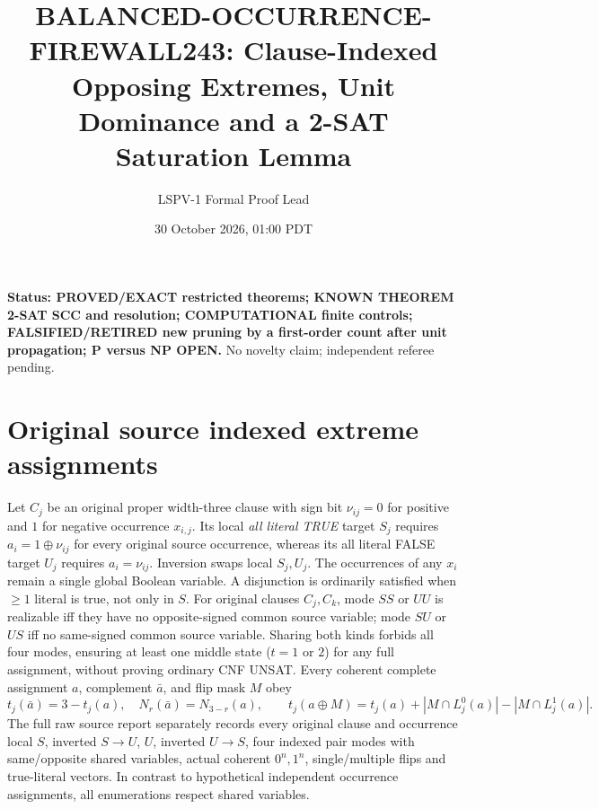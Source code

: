 \documentclass[10pt]{article}
\title{BALANCED-OCCURRENCE-FIREWALL243: Clause-Indexed Opposing Extremes, Unit Dominance and a 2-SAT Saturation Lemma}
\author{LSPV-1 Formal Proof Lead}
\date{30 October 2026, 01:00 PDT}
\begin{document}
\maketitle
\noindent\textbf{Status: PROVED/EXACT restricted theorems; KNOWN THEOREM 2-SAT SCC and resolution; COMPUTATIONAL finite controls; FALSIFIED/RETIRED new pruning by a first-order count after unit propagation; P versus NP OPEN.} No novelty claim; independent referee pending.
\section{Original source indexed extreme assignments}
Let $C_j$ be an original proper width-three clause with sign bit $\nu_{ij}=0$ for positive and $1$ for negative occurrence $x_{i,j}$. Its local \emph{all literal TRUE} target $S_j$ requires $a_i=1\oplus\nu_{ij}$ for every original source occurrence, whereas its all literal FALSE target $U_j$ requires $a_i=\nu_{ij}$. Inversion swaps local $S_j,U_j$. The occurrences of any $x_i$ remain a single global Boolean variable. A disjunction is ordinarily satisfied when $\ge1$ literal is true, not only in $S$.
For original clauses $C_j,C_k$, mode $SS$ or $UU$ is realizable iff they have no opposite-signed common source variable; mode $SU$ or $US$ iff no same-signed common source variable. Sharing both kinds forbids all four modes, ensuring at least one middle state ($t=1$ or $2$) for any full assignment, without proving ordinary CNF UNSAT.
Every coherent complete assignment $a$, complement $\bar a$, and flip mask $M$ obey
\[
t_j(\bar a)=3-t_j(a),\quad N_r(\bar a)=N_{3-r}(a),\qquad
t_j(a\oplus M)=t_j(a)+|M\cap L^0_j(a)|-|M\cap L^1_j(a)|.
\]
The full raw source report separately records every original clause and occurrence local $S$, inverted $S\to U$, $U$, inverted $U\to S$, four indexed pair modes with same/opposite shared variables, actual coherent $0^n,1^n$, single/multiple flips and true-literal vectors. In contrast to hypothetical independent occurrence assignments, all enumerations respect shared variables.
\end{document}
